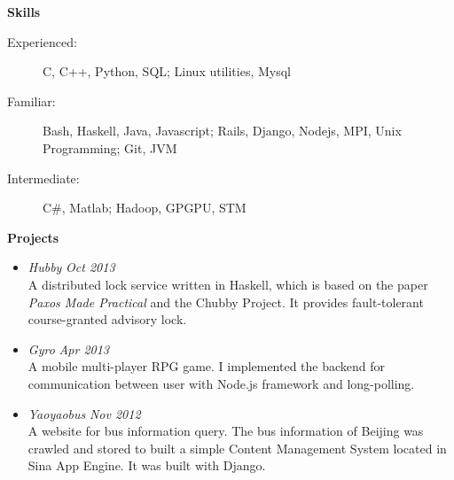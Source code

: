 \documentclass[letterpaper,11pt]{article}
\newcommand{\resheading}[1]{{\large \colorbox{mygrey}{\begin{minipage}{\textwidth}{\textbf{#1 \vphantom{p\^{E}}}}\end{minipage}}}}
\begin{document}
\resheading{Skills}
	\begin{description}
	\item[Experienced:] { \footnotesize C, C++, Python, SQL; Linux utilities, Mysql}
	\item[Familiar:] { \footnotesize Bash, Haskell, Java, Javascript; Rails, Django, Nodejs, MPI, Unix Programming; Git, JVM}
	\item[Intermediate:] { \footnotesize C\#, Matlab; Hadoop, GPGPU, STM}
	\end{description} %
\resheading{Projects}
	\begin{itemize}
	\item 
	{\sl Hubby} \hfill \textit{Oct 2013}\\
	{\footnotesize
	{A distributed lock service written in Haskell, which is based on the paper \emph{Paxos Made Practical} and the Chubby Project. It provides fault-tolerant course-granted advisory lock.}
	}
\item
	{\sl Gyro} \hfill \textit{Apr 2013}\\ 
	{ \footnotesize A mobile multi-player RPG game. I implemented the backend for communication between user with Node.js framework and long-polling.}
\item
	{\sl Yaoyaobus} \hfill \textit{Nov 2012}\\
	{ \footnotesize 
		{A website for bus information query. The bus information of Beijing was crawled and stored to built a simple Content Management System located in Sina App Engine. It was built with Django.}
	}
\end{itemize}
\end{document}

